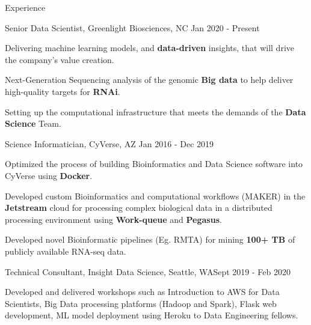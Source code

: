 \documentclass{resume} %
\begin{document}
\begin{rSection}{Experience } \itemsep -1pt        

\vspace{-3pt}

\begin{rSubsection}{Senior Data Scientist, Greenlight Biosciences, NC }{Jan 2020 - Present}{}    

\vspace{-3pt}

\item Delivering machine learning models, and \textbf{data-driven} insights, that will drive the company's value creation.
\item Next-Generation Sequencing analysis of the genomic \textbf{Big data} to help deliver high-quality targets for \textbf{RNAi}.
\item Setting up the computational infrastructure that meets the demands of the \textbf{Data Science} Team. 
\end{rSubsection} 

\vspace{-7pt}

\begin{rSubsection}{Science Informatician, CyVerse, AZ }{Jan 2016 - Dec 2019}{}    

\vspace{-3pt}

\item Optimized the process of building Bioinformatics and Data Science software into CyVerse using \textbf{Docker}.
\item Developed custom Bioinformatics and computational workflows (MAKER) in the \textbf{Jetstream} cloud for processing complex biological data in a distributed processing environment using \textbf{Work-queue} and \textbf{Pegasus}.
\item Developed novel Bioinformatic pipelines (Eg. RMTA) for mining \textbf{100+ TB} of publicly available RNA-seq data. 
\end{rSubsection} 

\vspace{-7pt}

\begin{rSubsection}{Technical Consultant, Insight Data Science, Seattle, WA}{Sept 2019 - Feb 2020}{}

\vspace{-3pt}

\item Developed and delivered workshops such as Introduction to AWS for Data Scientists, Big Data processing platforms (Hadoop and Spark), Flask web development, ML model deployment using Heroku to Data Engineering fellows.


\end{rSubsection}
\end{rSection}
\end{document}
